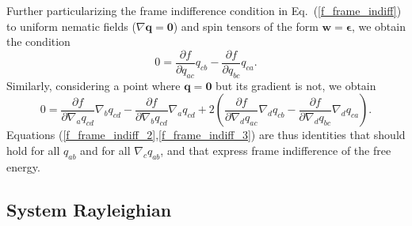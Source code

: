 \documentclass[12pt]{iopart}
\begin{document}
	Further particularizing the frame indifference condition in Eq.~(\ref{f_frame_indiff}) to uniform nematic fields ($\nabla\bm{q} = \bm{0}$)  and spin tensors of the form $\bm{w} = \bm{\epsilon}$, we obtain the condition 
	\begin{equation} 
		0 =  \frac{\partial f}{\partial q_{ac}} q_{cb} - \frac{\partial f}{\partial q_{bc}} q_{ca}.
		\label{f_frame_indiff_2}
	\end{equation}
	Similarly, considering a point where $\bm{q}=\bm{0}$ but its gradient is not, we obtain
	\begin{equation} 
		0 =  \frac{\partial f}{\partial \nabla_a q_{cd}} \nabla_b q_{cd} -  \frac{\partial f}{\partial \nabla_b q_{cd}} \nabla_a q_{cd} + 	
		2\left(\frac{\partial f}{\partial \nabla_d q_{ac}} \nabla_d q_{cb} - \frac{\partial f}{\partial \nabla_d q_{bc}} \nabla_d  q_{ca}\right).
		\label{f_frame_indiff_3}
	\end{equation}
	Equations (\ref{f_frame_indiff_2},\ref{f_frame_indiff_3}) are thus identities that should hold for all $q_{ab}$ and for all $\nabla_c q_{ab}$, and that express frame indifference of the free energy. 
	
	
	\subsection{System  Rayleighian}
	
\end{document}
